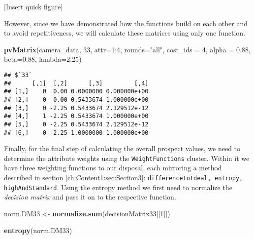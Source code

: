 \documentclass[]{article}
\newenvironment{Shaded}{\begin{snugshade}}{\end{snugshade}}
\newcommand{\KeywordTok}[1]{\textcolor[rgb]{0.13,0.29,0.53}{\textbf{{#1}}}}
\newcommand{\DataTypeTok}[1]{\textcolor[rgb]{0.13,0.29,0.53}{{#1}}}
\newcommand{\DecValTok}[1]{\textcolor[rgb]{0.00,0.00,0.81}{{#1}}}
\newcommand{\FloatTok}[1]{\textcolor[rgb]{0.00,0.00,0.81}{{#1}}}
\newcommand{\StringTok}[1]{\textcolor[rgb]{0.31,0.60,0.02}{{#1}}}
\newcommand{\NormalTok}[1]{{#1}}
\begin{document}
{[}Insert quick figure{]}

However, since we have demonstrated how the functions build on each
other and to avoid repetitiveness, we will calculate these matrices
using only one function.

\begin{Shaded}
\begin{Highlighting}[]
\KeywordTok{pvMatrix}\NormalTok{(camera_data, }\DecValTok{33}\NormalTok{, }\DataTypeTok{attr=}\DecValTok{1}\NormalTok{:}\DecValTok{4}\NormalTok{, }\DataTypeTok{rounds=}\StringTok{"all"}\NormalTok{, }\DataTypeTok{cost_ids =} \DecValTok{4}\NormalTok{,}
         \DataTypeTok{alpha =} \FloatTok{0.88}\NormalTok{, }\DataTypeTok{beta=}\FloatTok{0.88}\NormalTok{, }\DataTypeTok{lambda=}\FloatTok{2.25}\NormalTok{)}
\end{Highlighting}
\end{Shaded}

\begin{verbatim}
## $`33`
##      [,1]  [,2]      [,3]         [,4]
## [1,]    0  0.00 0.0000000 0.000000e+00
## [2,]    0  0.00 0.5433674 1.000000e+00
## [3,]    0 -2.25 0.5433674 2.129512e-12
## [4,]    1 -2.25 0.5433674 1.000000e+00
## [5,]    0 -2.25 0.5433674 2.129512e-12
## [6,]    0 -2.25 1.0000000 1.000000e+00
\end{verbatim}

Finally, for the final step of calculating the overall prospect values,
we need to determine the attribute weights using the
\texttt{WeightFunctions} cluster. Within it we have three weighting
functions to our disposal, each mirroring a method described in section
\ref{ch:Content1:sec:Section3}:
\texttt{differenceToIdeal, entropy, highAndStandard}. Using the entropy
method we first need to normalize the \emph{decision matrix} and pass it
on to the respective function.

\begin{Shaded}
\begin{Highlighting}[]
\NormalTok{norm.DM33 <-}\StringTok{ }\KeywordTok{normalize.sum}\NormalTok{(decisionMatrix33[[}\DecValTok{1}\NormalTok{]])}
\end{Highlighting}
\end{Shaded}

\begin{Shaded}
\begin{Highlighting}[]
\KeywordTok{entropy}\NormalTok{(norm.DM33)}
\end{Highlighting}
\end{Shaded}
\end{document}
